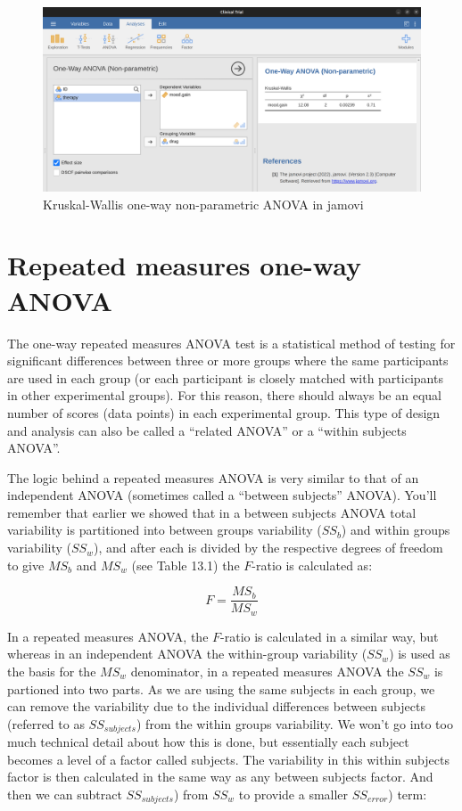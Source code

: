 \documentclass[
  a4paper,
]{book}
\begin{document}
\begin{figure}

\includegraphics[width=1\textwidth,height=\textheight]{images/fig13-8.png} \hfill{}

\caption{\label{fig-fig13-8}Kruskal-Wallis one-way non-parametric ANOVA
in jamovi}

\end{figure}

\hypertarget{repeated-measures-one-way-anova}{%
\section{Repeated measures one-way
ANOVA}\label{repeated-measures-one-way-anova}}

The one-way repeated measures ANOVA test is a statistical method of
testing for significant differences between three or more groups where
the same participants are used in each group (or each participant is
closely matched with participants in other experimental groups). For
this reason, there should always be an equal number of scores (data
points) in each experimental group. This type of design and analysis can
also be called a ``related ANOVA'' or a ``within subjects ANOVA''.

The logic behind a repeated measures ANOVA is very similar to that of an
independent ANOVA (sometimes called a ``between subjects'' ANOVA).
You'll remember that earlier we showed that in a between subjects ANOVA
total variability is partitioned into between groups variability
(\(SS_b\)) and within groups variability (\(SS_w\)), and after each is
divided by the respective degrees of freedom to give \(MS_b\) and
\(MS_w\) (see Table 13.1) the \(F\)-ratio is calculated as:

\[F=\frac{MS_b}{MS_w}\]

In a repeated measures ANOVA, the \(F\)-ratio is calculated in a similar
way, but whereas in an independent ANOVA the within-group variability
(\(SS_w\)) is used as the basis for the \(MS_w\) denominator, in a
repeated measures ANOVA the \(SS_w\) is partioned into two parts. As we
are using the same subjects in each group, we can remove the variability
due to the individual differences between subjects (referred to as
\(SS_{subjects}\)) from the within groups variability. We won't go into
too much technical detail about how this is done, but essentially each
subject becomes a level of a factor called subjects. The variability in
this within subjects factor is then calculated in the same way as any
between subjects factor. And then we can subtract \(SS_{subjects}\))
from \(SS_w\) to provide a smaller \(SS_{error}\)) term:
\end{document}
